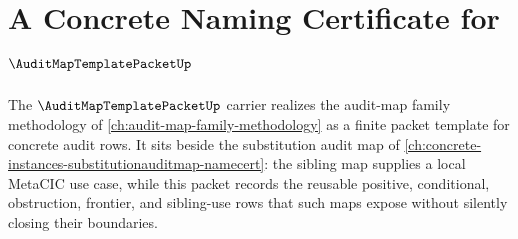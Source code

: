 \chapter{A Concrete Naming Certificate for $\AuditMapTemplatePacketUp$}
\label{ch:concrete-instances-auditmaptemplatepacket-namecert}

The $\AuditMapTemplatePacketUp$ carrier realizes the audit-map family methodology of \autoref{ch:audit-map-family-methodology} as a finite packet template for concrete audit rows. It sits beside the substitution audit map of \autoref{ch:concrete-instances-substitutionauditmap-namecert}: the sibling map supplies a local MetaCIC use case, while this packet records the reusable positive, conditional, obstruction, frontier, and sibling-use rows that such maps expose without silently closing their boundaries.

